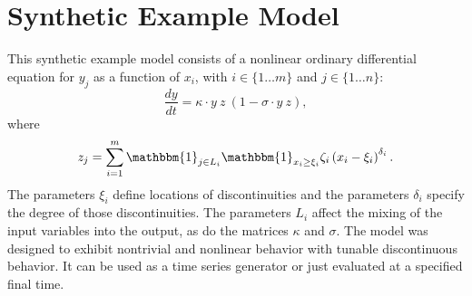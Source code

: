 \documentclass[12pt]{article}
\begin{document}








\appendix


\section{Synthetic Example Model}
\label{sec:toyapp}

This synthetic example model consists of a nonlinear ordinary differential equation for $y_j$ as a function of $x_i$, with $i \in \{ 1 \ldots m \}$ and $j \in \{ 1 \ldots n \}$:
\begin{equation*}
    \frac{dy}{dt} = \kappa \cdot y \ z \ \left( 1 - \sigma \cdot y \  z \right) ,
\end{equation*}
where
\begin{equation*}
    z_j = \sum_{i=1}^m \mathbbm{1}_{j \in L_i} \mathbbm{1}_{x_i \ge \xi_i} \zeta_i \left( x_i - \xi_i \right)^{\delta_i} .
\end{equation*}
The parameters $\xi_i$ define locations of discontinuities and the parameters $\delta_i$ specify the degree of those discontinuities. The parameters $L_i$ affect the mixing of the input variables into the output, as do the matrices $\kappa$ and $\sigma$. The model was designed to exhibit nontrivial and nonlinear behavior with tunable discontinuous behavior. It can be used as a time series generator or just evaluated at a specified final time.
\end{document}
